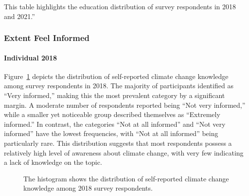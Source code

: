 \documentclass[
  letterpaper,
  DIV=11,
  numbers=noendperiod]{scrartcl}
\let\oldparagraph\paragraph
\renewcommand{\paragraph}[1]{\oldparagraph{#1}\mbox{}}
\begin{document}
This table highlights the education distribution of survey respondents
in 2018 and 2021.''

\subsubsection{Extent Feel Informed}\label{extent-feel-informed}

\paragraph{Individual 2018}\label{individual-2018-2}

Figure~\ref{fig-three} depicts the distribution of self-reported climate
change knowledge among survey respondents in 2018. The majority of
participants identified as ``Very informed,'' making this the most
prevalent category by a significant margin. A moderate number of
respondents reported being ``Not very informed,'' while a smaller yet
noticeable group described themselves as ``Extremely informed.'' In
contrast, the categories ``Not at all informed'' and ``Not very
informed'' have the lowest frequencies, with ``Not at all informed''
being particularly rare. This distribution suggests that most
respondents possess a relatively high level of awareness about climate
change, with very few indicating a lack of knowledge on the topic.

\begin{figure}


\caption{\label{fig-three}The histogram shows the distribution of
self-reported climate change knowledge among 2018 survey respondents.}

\end{figure}%
\end{document}

